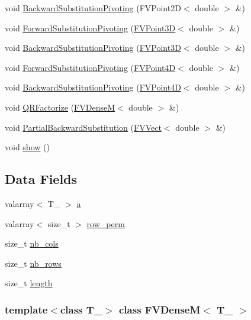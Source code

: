 \begin{DoxyCompactItemize}
void \hyperlink{classFVDenseM_af0e30762af46f60b2e6dc4cbabdbb4bd}{BackwardSubstitutionPivoting} (FVPoint2D$<$ double $>$ \&)
\item 
void \hyperlink{classFVDenseM_adbc33db602247330e73b05ecef74678f}{ForwardSubstitutionPivoting} (\hyperlink{classFVPoint3D}{FVPoint3D}$<$ double $>$ \&)
\item 
void \hyperlink{classFVDenseM_aebf5f34295c995ea440e913e0e27c32d}{BackwardSubstitutionPivoting} (\hyperlink{classFVPoint3D}{FVPoint3D}$<$ double $>$ \&)
\item 
void \hyperlink{classFVDenseM_a5b48ed3d6cb0251084e6b6e5b7a261fc}{ForwardSubstitutionPivoting} (\hyperlink{classFVPoint4D}{FVPoint4D}$<$ double $>$ \&)
\item 
void \hyperlink{classFVDenseM_ae3fa5328eff5ad4ebe01c8723ea8b26c}{BackwardSubstitutionPivoting} (\hyperlink{classFVPoint4D}{FVPoint4D}$<$ double $>$ \&)
\item 
void \hyperlink{classFVDenseM_ab0d4d86f44473b25724ef76ddd5663a1}{QRFactorize} (\hyperlink{classFVDenseM}{FVDenseM}$<$ double $>$ \&)
\item 
void \hyperlink{classFVDenseM_ae006829f93858c6796e73533c1784e9e}{PartialBackwardSubstitution} (\hyperlink{classFVVect}{FVVect}$<$ double $>$ \&)
\item 
void \hyperlink{classFVDenseM_a4b148f40a95444d5669406b918ad2f52}{show} ()
\end{DoxyCompactItemize}
\subsection*{Data Fields}
\begin{DoxyCompactItemize}
\item 
valarray$<$ T\_\- $>$ \hyperlink{classFVDenseM_a79134a5b7e0d6acf861da02da21d735e}{a}
\item 
valarray$<$ size\_\-t $>$ \hyperlink{classFVDenseM_a8c10fbbfbdfafbb79c6856b23415ec4f}{row\_\-perm}
\item 
size\_\-t \hyperlink{classFVDenseM_a4451904bc3a87b7e94ba9967cfe5acc9}{nb\_\-cols}
\item 
size\_\-t \hyperlink{classFVDenseM_a660778a5412448cf6b641e67d1d70011}{nb\_\-rows}
\item 
size\_\-t \hyperlink{classFVDenseM_ae809d5359ac030c60a30a8f0b2294b82}{length}
\end{DoxyCompactItemize}
\subsubsection*{template$<$class T\_\-$>$ class FVDenseM$<$ T\_\- $>$}



